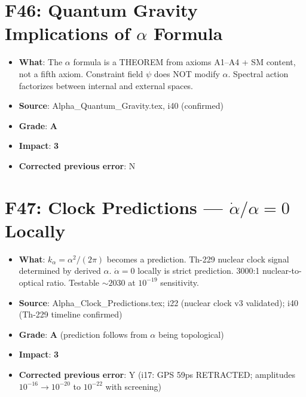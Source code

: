 \documentclass[11pt,a4paper]{article}
\newcommand{\grade}[1]{\textbf{#1}}
\newcommand{\impact}[1]{\textbf{#1}}
\begin{document}
\section{F46: Quantum Gravity Implications of $\alpha$ Formula}
\begin{itemize}[nosep]
\item \textbf{What}: The $\alpha$ formula is a THEOREM from axioms A1--A4 + SM content, not a fifth axiom. Constraint field $\psi$ does NOT modify $\alpha$. Spectral action factorizes between internal and external spaces.
\item \textbf{Source}: Alpha\_Quantum\_Gravity.tex, i40 (confirmed)
\item \textbf{Grade}: \grade{A}
\item \textbf{Impact}: \impact{3}
\item \textbf{Corrected previous error}: N
\end{itemize}

\section{F47: Clock Predictions --- $\dot{\alpha}/\alpha = 0$ Locally}
\begin{itemize}[nosep]
\item \textbf{What}: $k_\alpha = \alpha^2/(2\pi)$ becomes a prediction. Th-229 nuclear clock signal determined by derived $\alpha$. $\dot{\alpha} = 0$ locally is strict prediction. 3000:1 nuclear-to-optical ratio. Testable $\sim 2030$ at $10^{-19}$ sensitivity.
\item \textbf{Source}: Alpha\_Clock\_Predictions.tex; i22 (nuclear clock v3 validated); i40 (Th-229 timeline confirmed)
\item \textbf{Grade}: \grade{A} (prediction follows from $\alpha$ being topological)
\item \textbf{Impact}: \impact{3}
\item \textbf{Corrected previous error}: Y (i17: GPS 59ps RETRACTED; amplitudes $10^{-16} \to 10^{-20}$ to $10^{-22}$ with screening)
\end{itemize}

\end{document}
